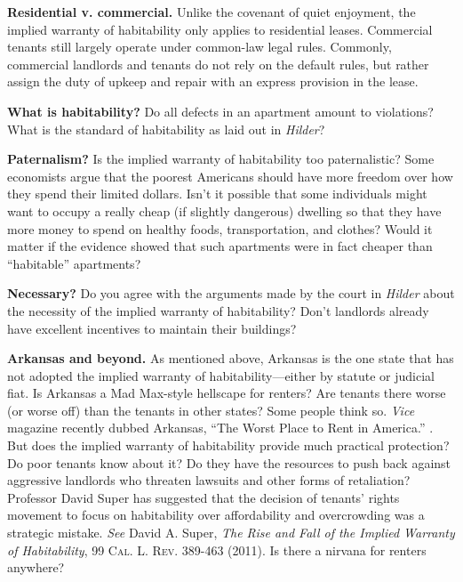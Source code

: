 
\item \textbf{Residential v. commercial.} Unlike the covenant of quiet
enjoyment, the implied warranty of habitability only applies to residential
leases.  Commercial tenants still largely operate under common-law legal rules.
 Commonly, commercial landlords and tenants do not rely on the default rules,
but rather assign the duty of upkeep and repair with an express provision in
the lease. 


\item \textbf{What is habitability?} Do all defects in an apartment
amount to violations?  What is the standard of habitability as laid out in
\textit{Hilder}?  


\item \textbf{Paternalism?} Is the implied warranty of habitability too
paternalistic?  Some economists argue that the poorest Americans should have
more freedom over how they spend their limited dollars.  Isn't it possible that
some individuals might want to occupy a really cheap (if slightly dangerous)
dwelling so that they have more money to spend on healthy foods,
transportation, and clothes?  Would it matter if the evidence showed that such
apartments were in fact cheaper than ``habitable'' apartments?


\item \textbf{Necessary?} Do you agree with the arguments made by the court in
\textit{Hilder} about the necessity of the implied warranty of habitability? 
Don't landlords already have excellent incentives to maintain their buildings?


\item \textbf{Arkansas and beyond.}  As mentioned above, Arkansas is the one
state that has not adopted the implied warranty of habitability---either by
statute or judicial fiat.  Is Arkansas a Mad Max-style hellscape for renters? 
Are tenants there worse (or worse off) than the tenants in other states?  Some
people think so.  \textit{Vice} magazine recently dubbed Arkansas, ``The Worst
Place to Rent in America.'' .
But does the implied
warranty of habitability provide much practical protection?  Do poor tenants
know about it?  Do they have the resources to push back against aggressive
landlords who threaten lawsuits and other forms of retaliation?  Professor
David Super has suggested that the decision of tenants' rights movement to
focus on habitability over affordability and overcrowding was a strategic
mistake.  \textit{See} David A. Super, \textit{The Rise and Fall of the Implied
Warranty of Habitability}, 99 \textsc{Cal. L. Rev}. 389-463 (2011).  Is there a
nirvana for renters anywhere?  


